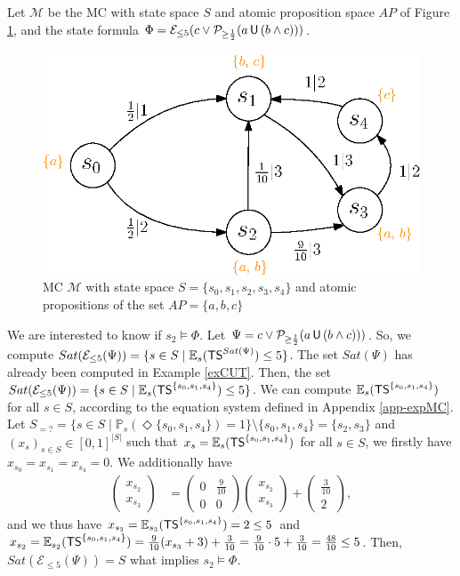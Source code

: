 \begin{example}
  Let $\mathcal{M}$ be the MC with state space $S$ and atomic proposition space $AP$ of Figure \ref{CUTexample3}, and the state formula $\Phi = \mathcal{E}_{\leq{5}}(c \vee \mathcal{P}_{\geq \frac{1}{2}}(a \,\text{\sffamily U}\, (b \wedge c)))$.
  \begin{figure}[h]
    \centering
    \includegraphics[width=0.5\linewidth]{resources/CUTexample3}
    \captionsetup{justification=centering}
    \caption{MC $\mathcal{M}$ with state space $S = \{s_0, s_1, s_2, s_3, s_4\}$ and atomic propositions of the set $AP = \{a, b, c\}$}
    \label{CUTexample3}
  \end{figure}
  We are interested to know if $s_2 \models \Phi$.
  Let $\Psi = c \vee \mathcal{P}_{\geq \frac{1}{2}}(a \,\text{\sffamily U}\, (b \wedge c)))$.
  So, we compute $Sat(\mathcal{E}_{\leq 5}(\Psi)) = \{s \in S \; | \; \mathbb{E}_s(\text{\sffamily TS}^{Sat(\Psi)}) \leq 5\}$. The set $Sat(\Psi)$
  has already been computed in Example \ref{exCUT}.
  Then, the set $Sat(\mathcal{E}_{\leq 5}(\Psi)) = \{s \in S \;|\; \mathbb{E}_s(\text{\sffamily TS}^{\{s_0, s_1, s_4\}})\leq 5\}$.
  We can compute
  $\mathbb{E}_s(\text{\sffamily TS}^{\{s_0, s_1, s_4\}})$ for all $s \in S$, according to the equation system defined in Appendix \ref{app-expMC}.
  Let $S_{=?} = \{ s \in S \; | \; \mathbb{P}_s(\Diamond \{s_0, s_1, s_4\}) = 1 \} \setminus \{s_0, s_1, s_4\} =
  \{s_2, s_3\}$ and $(x_s)_{s \in S} \in [0, 1]^{|S|}$ such that $x_s = \mathbb{E}_s(\text{\sffamily TS}^{\{s_0, s_1, s_4\}})$ for all $s \in S$, we firstly have $x_{s_0} = x_{s_1} = x_{s_4} = 0$.
  We additionally have
  \begin{align*}
    \begin{pmatrix}
      x_{s_2}\\[0.3em]
      x_{s_3}
  	\end{pmatrix} &=
    \begin{pmatrix}
      0 & \frac{9}{10} \\[0.3em]
      0  & 0
    \end{pmatrix}
    \begin{pmatrix}
      x_{s_2}\\[0.3em]
      x_{s_3}
  	\end{pmatrix}
    +
    \begin{pmatrix}
      \frac{3}{10}\\[0.3em]
      2
    \end{pmatrix},
  \end{align*}
  and we thus have $x_{s_3} = \mathbb{E}_{s_3}(\text{\sffamily TS}^{\{s_0, s_1, s_4\}}) = 2 \leq 5$ and $
    x_{s_2} = \mathbb{E}_{s_2}(\text{\sffamily TS}^{\{s_0, s_1, s_4\}}) = \frac{9}{10} (x_{s_3} + 3) + \frac{3}{10}
    = \frac{9}{10} \cdot 5 + \frac{3}{10}
    = \frac{48}{10}\leq 5$. Then, $Sat(\mathcal{E}_{\leq 5}(\Psi)) = S$ what implies $s_2 \models \Phi$.
\end{example}

